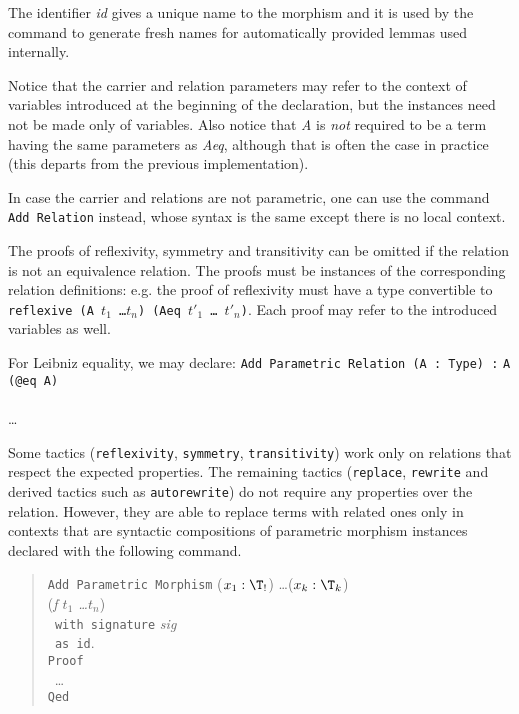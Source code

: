 The identifier \textit{id} gives a unique name to the morphism and it is
used by the command to generate fresh names for automatically provided lemmas
used internally.

Notice that the carrier and relation parameters may refer to the context 
of variables introduced at the beginning of the declaration, but the
instances need not be made only of variables.
Also notice that \textit{A} is \emph{not} required to be a term
having the same parameters as \textit{Aeq}, although that is often the
case in practice (this departs from the previous implementation).

In case the carrier and relations are not parametric, one can use the
command \texttt{Add Relation} instead, whose syntax is the same except
there is no local context.

The proofs of reflexivity, symmetry and transitivity can be omitted if the
relation is not an equivalence relation. The proofs must be instances of the
corresponding relation definitions: e.g. the proof of reflexivity must
have a type convertible to \texttt{reflexive (A $t_1$ \ldots $t_n$) (Aeq $t'_1$ \ldots
  $t'_n$)}. Each proof may refer to the introduced variables as well. 

\begin{cscexample}
For Leibniz equality, we may declare:
\texttt{Add Parametric Relation (A : Type) :} \texttt{A (@eq A)}\\
~\\
\ldots
\end{cscexample}

Some tactics
(\texttt{reflexivity}, \texttt{symmetry}, \texttt{transitivity}) work only
on relations that respect the expected properties. The remaining tactics
(\texttt{replace}, \texttt{rewrite} and derived tactics such as
\texttt{autorewrite}) do not require any properties over the relation.
However, they are able to replace terms with related ones only in contexts
that are syntactic compositions of parametric morphism instances declared with
the following command.

\begin{quote}
  \texttt{Add Parametric Morphism} ($x_1 : \T_!$) \ldots ($x_k : \T_k$)\\
  (\textit{f $t_1$ \ldots $t_n$})\\
  \texttt{~with signature} \textit{sig}\\
  \texttt{~as id}.\\
  \texttt{Proof}\\
  ~\ldots\\
  \texttt{Qed}
\end{quote}

